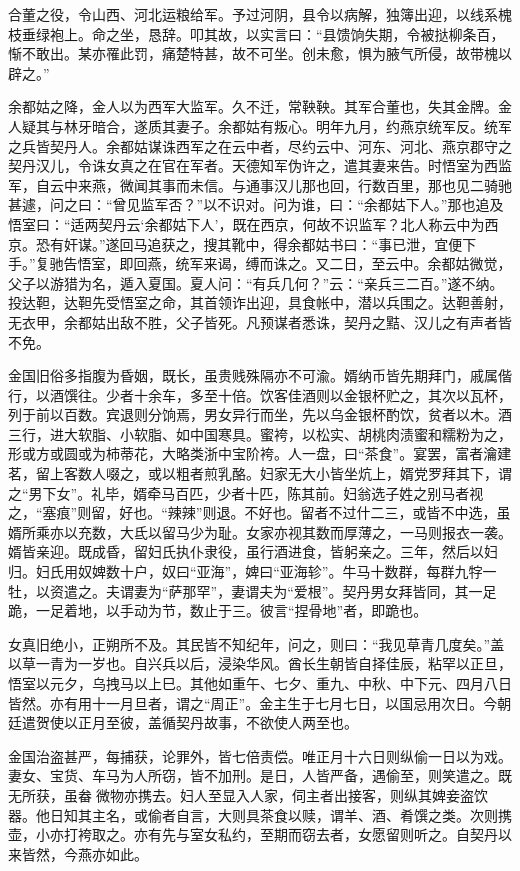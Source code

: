 \documentclass[]{article}
\begin{document}
合董之役，令山西、河北运粮给军。予过河阴，县令以病解，独簿出迎，以线系槐枝垂绿袍上。命之坐，恳辞。叩其故，以实言曰：``县馈饷失期，令被挞柳条百，惭不敢出。某亦罹此罚，痛楚特甚，故不可坐。创未愈，惧为腋气所侵，故带槐以辟之。''

余都姑之降，金人以为西军大监军。久不迁，常鞅鞅。其军合董也，失其金牌。金人疑其与林牙暗合，遂质其妻子。余都姑有叛心。明年九月，约燕京统军反。统军之兵皆契丹人。余都姑谋诛西军之在云中者，尽约云中、河东、河北、燕京郡守之契丹汉儿，令诛女真之在官在军者。天德知军伪许之，遣其妻来告。时悟室为西监军，自云中来燕，微闻其事而未信。与通事汉儿那也回，行数百里，那也见二骑驰甚遽，问之曰：``曾见监军否？''以不识对。问为谁，曰：``余都姑下人。''那也追及悟室曰：``适两契丹云`余都姑下人'，既在西京，何故不识监军？北人称云中为西京。恐有奸谋。''遂回马追获之，搜其靴中，得余都姑书曰：``事已泄，宜便下手。''复驰告悟室，即回燕，统军来谒，缚而诛之。又二日，至云中。余都姑微觉，父子以游猎为名，遁入夏国。夏人问：``有兵几何？''云：``亲兵三二百。''遂不纳。投达靼，达靼先受悟室之命，其首领诈出迎，具食帐中，潜以兵围之。达靼善射，无衣甲，余都姑出敌不胜，父子皆死。凡预谋者悉诛，契丹之黠、汉儿之有声者皆不免。

金国旧俗多指腹为昏姻，既长，虽贵贱殊隔亦不可渝。婿纳币皆先期拜门，戚属偕行，以酒馔往。少者十余车，多至十倍。饮客佳酒则以金银杯贮之，其次以瓦杯，列于前以百数。宾退则分饷焉，男女异行而坐，先以乌金银杯酌饮，贫者以木。酒三行，进大软脂、小软脂、如中国寒具。蜜袴，以松实、胡桃肉渍蜜和糯粉为之，形或方或圆或为柿蒂花，大略类浙中宝阶袴。人一盘，曰``茶食''。宴罢，富者瀹建茗，留上客数人啜之，或以粗者煎乳酪。妇家无大小皆坐炕上，婿党罗拜其下，谓之``男下女''。礼毕，婿牵马百匹，少者十匹，陈其前。妇翁选子姓之别马者视之，``塞痕''则留，好也。``辣辣''则退。不好也。留者不过什二三，或皆不中选，虽婿所乘亦以充数，大氐以留马少为耻。女家亦视其数而厚薄之，一马则报衣一袭。婿皆亲迎。既成昏，留妇氏执仆隶役，虽行酒进食，皆躬亲之。三年，然后以妇归。妇氏用奴婢数十户，奴曰``亚海''，婢曰``亚海轸''。牛马十数群，每群九牸一牡，以资遣之。夫谓妻为``萨那罕''，妻谓夫为``爱根''。契丹男女拜皆同，其一足跪，一足着地，以手动为节，数止于三。彼言``捏骨地''者，即跪也。

女真旧绝小，正朔所不及。其民皆不知纪年，问之，则曰：``我见草青几度矣。''盖以草一青为一岁也。自兴兵以后，浸染华风。酋长生朝皆自择佳辰，粘罕以正旦，悟室以元夕，乌拽马以上巳。其他如重午、七夕、重九、中秋、中下元、四月八日皆然。亦有用十一月旦者，谓之``周正''。金主生于七月七日，以国忌用次日。今朝廷遣贺使以正月至彼，盖循契丹故事，不欲使人两至也。

金国治盗甚严，每捕获，论罪外，皆七倍责偿。唯正月十六日则纵偷一日以为戏。妻女、宝货、车马为人所窃，皆不加刑。是日，人皆严备，遇偷至，则笑遣之。既无所获，虽畚微物亦携去。妇人至显入人家，伺主者出接客，则纵其婢妾盗饮器。他日知其主名，或偷者自言，大则具茶食以赎，谓羊、酒、肴馔之类。次则携壶，小亦打袴取之。亦有先与室女私约，至期而窃去者，女愿留则听之。自契丹以来皆然，今燕亦如此。
\end{document}
